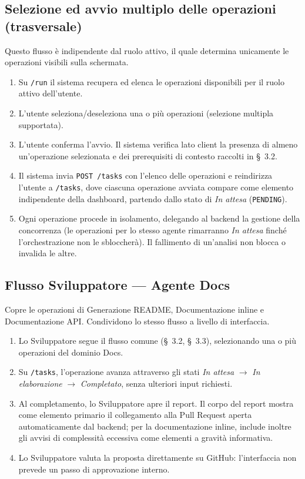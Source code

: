 \documentclass[11pt,a4paper]{article}
\begin{document}
\subsection{Selezione ed avvio multiplo delle operazioni (trasversale)}

Questo flusso è indipendente dal ruolo attivo, il quale determina unicamente le operazioni visibili sulla schermata.

\begin{enumerate}
    \item Su \texttt{/run} il sistema recupera ed elenca le operazioni disponibili per il ruolo attivo dell'utente.
    \item L'utente seleziona/deseleziona una o più operazioni (selezione multipla supportata).
    \item L'utente conferma l'avvio. Il sistema verifica lato client la presenza di almeno un'operazione selezionata e dei prerequisiti di contesto raccolti in \S~3.2.
    \item Il sistema invia \texttt{POST /tasks} con l'elenco delle operazioni e reindirizza l'utente a \texttt{/tasks}, dove ciascuna operazione avviata compare come elemento indipendente della dashboard, partendo dallo stato di \emph{In attesa} (\texttt{PENDING}).
    \item Ogni operazione procede in isolamento, delegando al backend la gestione della concorrenza (le operazioni per lo stesso agente rimarranno \emph{In attesa} finché l'orchestrazione non le sbloccherà). Il fallimento di un'analisi non blocca o invalida le altre.
\end{enumerate}

\subsection{Flusso Sviluppatore --- Agente Docs}

Copre le operazioni di Generazione README, Documentazione inline e Documentazione API. Condividono lo stesso flusso a livello di interfaccia.

\begin{enumerate}
    \item Lo Sviluppatore segue il flusso comune (\S~3.2, \S~3.3), selezionando una o più operazioni del dominio Docs.
    \item Su \texttt{/tasks}, l'operazione avanza attraverso gli stati \emph{In attesa} $\to$ \emph{In elaborazione} $\to$ \emph{Completato}, senza ulteriori input richiesti.
    \item Al completamento, lo Sviluppatore apre il report. Il corpo del report mostra come elemento primario il collegamento alla Pull Request aperta automaticamente dal backend; per la documentazione inline, include inoltre gli avvisi di complessità eccessiva come elementi a gravità informativa.
    \item Lo Sviluppatore valuta la proposta direttamente su GitHub: l'interfaccia non prevede un passo di approvazione interno.
\end{enumerate}
\end{document}
